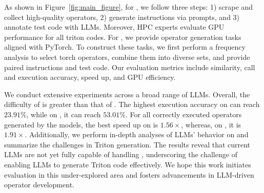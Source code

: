 As shown in Figure~\ref{fig:main_figure}, for \benchone, we follow three steps: 1) scrape and collect high-quality operators, 2) generate instructions via prompts, and 3) annotate test code with LLMs.
Moreover, HPC experts evaluate GPU performance for all triton codes. 
For \benchtwo, we provide operator generation tasks aligned with PyTorch.
To construct these tasks, we first perform a frequency analysis to select torch operators, combine them into diverse sets, and provide paired instructions and test code. 
Our evaluation metrics include similarity, call and execution accuracy, speed up, and GPU efficiency.


We conduct extensive experiments across a broad range of LLMs. Overall, the difficulty of \benchone is greater than that of \benchtwo. 
The highest execution accuracy on \benchone can reach $23.91$\%, while on \benchtwo, it can reach $53.01$\%. 
For all correctly executed operators generated by the models, the best speed up on \benchone is $1.56\times$, whereas, on \benchtwo, it is $1.91\times$. 
Additionally, we perform in-depth analyses of LLMs’ behavior on \benchall and summarize the challenges in Triton generation. 
The results reveal that current LLMs are not yet fully capable of handling \benchall, underscoring the challenge of enabling LLMs to generate Triton code effectively. 
We hope this work initiates evaluation in this under-explored area and fosters advancements in LLM-driven operator development.